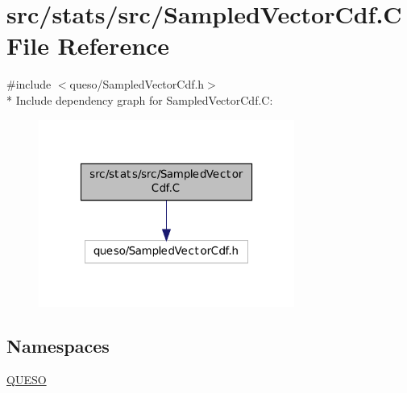 \hypertarget{_sampled_vector_cdf_8_c}{\section{src/stats/src/\-Sampled\-Vector\-Cdf.C File Reference}
\label{_sampled_vector_cdf_8_c}
}
{\ttfamily \#include $<$queso/\-Sampled\-Vector\-Cdf.\-h$>$}\\*
Include dependency graph for Sampled\-Vector\-Cdf.\-C\-:
\nopagebreak
\begin{figure}[H]
\begin{center}
\leavevmode
\includegraphics[width=238pt]{_sampled_vector_cdf_8_c__incl}
\end{center}
\end{figure}
\subsection*{Namespaces}
\begin{DoxyCompactItemize}
\item 
\hyperlink{namespace_q_u_e_s_o}{Q\-U\-E\-S\-O}
\end{DoxyCompactItemize}
